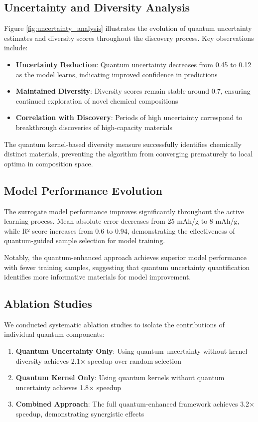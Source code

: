 \documentclass[twocolumn]{article}
\begin{document}
\subsection{Uncertainty and Diversity Analysis}

Figure \ref{fig:uncertainty_analysis} illustrates the evolution of quantum uncertainty estimates and diversity scores throughout the discovery process. Key observations include:

\begin{itemize}
\item \textbf{Uncertainty Reduction}: Quantum uncertainty decreases from 0.45 to 0.12 as the model learns, indicating improved confidence in predictions
\item \textbf{Maintained Diversity}: Diversity scores remain stable around 0.7, ensuring continued exploration of novel chemical compositions
\item \textbf{Correlation with Discovery}: Periods of high uncertainty correspond to breakthrough discoveries of high-capacity materials
\end{itemize}

The quantum kernel-based diversity measure successfully identifies chemically distinct materials, preventing the algorithm from converging prematurely to local optima in composition space.

\subsection{Model Performance Evolution}

The surrogate model performance improves significantly throughout the active learning process. Mean absolute error decreases from 25 mAh/g to 8 mAh/g, while R² score increases from 0.6 to 0.94, demonstrating the effectiveness of quantum-guided sample selection for model training.

Notably, the quantum-enhanced approach achieves superior model performance with fewer training samples, suggesting that quantum uncertainty quantification identifies more informative materials for model improvement.

\subsection{Ablation Studies}

We conducted systematic ablation studies to isolate the contributions of individual quantum components:

\begin{enumerate}
\item \textbf{Quantum Uncertainty Only}: Using quantum uncertainty without kernel diversity achieves 2.1× speedup over random selection
\item \textbf{Quantum Kernel Only}: Using quantum kernels without quantum uncertainty achieves 1.8× speedup
\item \textbf{Combined Approach}: The full quantum-enhanced framework achieves 3.2× speedup, demonstrating synergistic effects
\end{enumerate}
\end{document}
